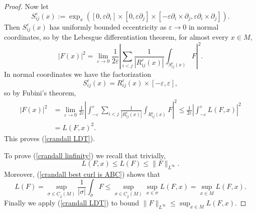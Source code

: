 \documentclass[reqno,11pt]{amsart}
\newcommand{\Chain}{\underline C}
\theoremstyle{definition}
\numberwithin{equation}{section}
\begin{document}
\begin{proof}
Now let
$$S_{ij}^\varepsilon(x) := \exp_x([0, \varepsilon \partial_i] \times [0, \varepsilon \partial_j] \times [-\varepsilon \partial_i \times \partial_j, \varepsilon \partial_i \times \partial_j]).$$
Then $S_{ij}^\varepsilon(x)$ has uniformly bounded eccentricity as $\varepsilon \to 0$ in normal coordinates, so by the Lebesgue differentiation theorem, for almost every $x \in M$,
$$|F(x)|^2 = \lim_{\varepsilon \to 0} \frac{1}{2\varepsilon} \left|\sum_{i < j} \frac{1}{|R_{ij}^\varepsilon(x)|} \int_{S_{ij}^\varepsilon(x)} F\right|^2.$$
In normal coordinates we have the factorization 
$$S_{ij}^\varepsilon(x) = R_{ij}^\varepsilon(x) \times [-\varepsilon, \varepsilon],$$
so by Fubini's theorem, 
\begin{align*}
|F(x)|^2 
&= \lim_{\varepsilon \to 0} \frac{1}{2\varepsilon} \left|\int_{-\varepsilon}^\varepsilon \sum_{i < j} \frac{1}{|R_{ij}^\varepsilon(x)|} \int_{R_{ij}^\varepsilon(x)} F\right|^2 \leq \frac{1}{2\varepsilon} \left|\int_{-\varepsilon}^\varepsilon L(F, x)\right|^2 \\
& = L(F, x)^2.
\end{align*}
This proves (\ref{crandall LDT}).

To prove (\ref{crandall linfinity}) we recall that trivially,
$$L(F, x) \leq L(F) \leq \|F\|_{L^\infty}.$$
Moreover, (\ref{crandall best curl is ABC}) shows that
$$L(F) = \sup_{\sigma \in \Chain_2(M)} \frac{1}{|\sigma|} \int_\sigma F \leq \sup_{\sigma \in \Chain_2(M)} \sup_{x \in \sigma} L(F, x) = \sup_{x \in M} L(F, x).$$
Finally we apply (\ref{crandall LDT}) to bound $\|F\|_{L^\infty} \leq \sup_{x \in M} L(F, x)$.
\end{proof}
\end{document}
